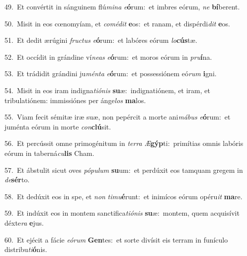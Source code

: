 {\numbfont\textcolor{\numbcolor}{49.}}~Et convértit in sánguinem flú\-\textit{mi}\-\textit{na} \textit{e}\-\textbf{ó}rum:~\star et imbres eórum, \textit{ne} \textbf{bí}\-berent.\par
{\numbfont\textcolor{\numbcolor}{50.}}~Misit in eos cœnomyíam, et \textit{com}\-\textit{é}\textit{dit} \textbf{e}\-os:~\star et ranam, et dispérdi\textit{dit} \textbf{e}\-os.\par
{\numbfont\textcolor{\numbcolor}{51.}}~Et dedit ærúgini \textit{fruc}\-\textit{tus} \textit{e}\-\textbf{ó}rum:~\star et labóres eórum \textit{lo}\-\textbf{cús}tæ.\par
{\numbfont\textcolor{\numbcolor}{52.}}~Et occídit in grándine ví\-\textit{ne}\-\textit{as} \textit{e}\-\textbf{ó}rum:~\star et moros eórum in \textit{pru}\-\textbf{í}na.\par
{\numbfont\textcolor{\numbcolor}{53.}}~Et trádidit grándini ju\-\textit{mén}\-\textit{ta} \textit{e}\-\textbf{ó}rum:~\star et possessiónem eó\textit{rum} \textbf{i}\-gni.\par
{\numbfont\textcolor{\numbcolor}{54.}}~Misit in eos iram indigna\-\textit{ti}\-\textit{ó}\textit{nis} \textbf{su}\-æ:~\star indignatiónem, et iram, et tribulatiónem: immissiónes per ánge\textit{los} \textbf{ma}\-los.\par
{\numbfont\textcolor{\numbcolor}{55.}}~Viam fecit sémitæ iræ suæ, non pepércit a morte ani\-\textit{má}\-\textit{bus} \textit{e}\-\textbf{ó}rum:~\star et juménta eórum in morte \textit{con}\-\textbf{clú}sit.\par
{\numbfont\textcolor{\numbcolor}{56.}}~Et percússit omne primogénitum in \textit{ter}\-\textit{ra} \textit{Æ}\-\textbf{gýp}ti:~\star primítias omnis labóris eórum in taberná\-\textit{cu}\-\textbf{lis} Cham.\par
{\numbfont\textcolor{\numbcolor}{57.}}~Et ábstulit sicut oves \textit{pó}\-\textit{pu}\textit{lum} \textbf{su}\-um:~\star et perdúxit eos tamquam gregem in \textit{de}\-\textbf{sér}to.\par
{\numbfont\textcolor{\numbcolor}{58.}}~Et dedúxit eos in spe, et \textit{non} \textit{ti}\-\textit{mu}\textbf{é}runt:~\star et inimícos eórum opéru\textit{it} \textbf{ma}\-re.\par
{\numbfont\textcolor{\numbcolor}{59.}}~Et indúxit eos in montem sanctifica\-\textit{ti}\-\textit{ó}\textit{nis} \textbf{su}\-æ:~\star montem, quem acquisívit déxte\textit{ra} \textbf{e}\-jus.\par
{\numbfont\textcolor{\numbcolor}{60.}}~Et ejécit a fácie \textit{e}\-\textit{ó}\textit{rum} \textbf{Gen}\-tes:~\star et sorte divísit eis terram in funículo distribu\-\textit{ti}\-\textbf{ó}nis.\par

